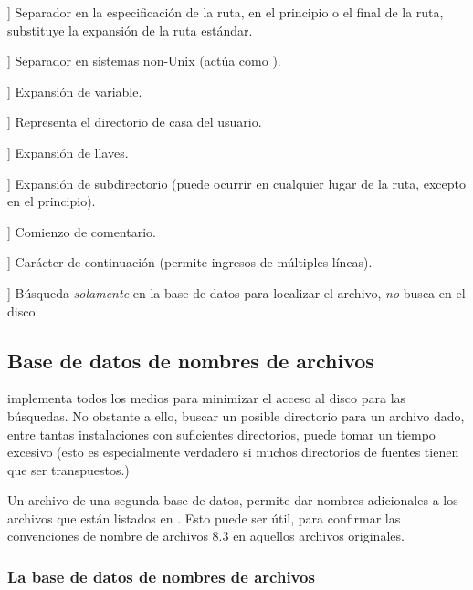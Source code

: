 \documentclass{article}
\begin{document}
\newcommand{\CODE}[1]{\makebox[3em][l]{\code{#1}}}
\begin{ttdescription}
        \item[\CODE{:}] Separador en la especificación de la ruta, en
            el principio o el final de la ruta, substituye la
            expansión de la ruta estándar. \par
	\item[\CODE{;}] Separador en sistemas non-Unix (actúa como
		\code{:}).
	\item[\CODE{\$}] Expansión de variable.
        \item[\CODE{\string~}] Representa el directorio de casa del
            usuario.
	\item[\CODE{\char`\{...\char`\}}] Expansión de llaves.
        \item[\CODE{//}] Expansión de subdirectorio (puede ocurrir en
            cualquier lugar de la ruta, excepto en el principio).
	\item[\CODE{\%}] Comienzo de comentario.
        \item[\CODE{\bs}] Carácter de continuación (permite ingresos
            de múltiples líneas).
        \item[\CODE{!!}] Búsqueda \emph{solamente} en la base de datos
            para localizar el archivo, \emph{no} busca en el disco.
\end{ttdescription}

\subsection{Base de datos de nombres de archivos}
\label{sec:filename-database}

\KPS{} implementa todos los medios para minimizar el acceso al disco para las
búsquedas. No obstante a ello, buscar un posible directorio para un
archivo dado, entre tantas instalaciones con suficientes directorios,
puede tomar un tiempo excesivo (esto es especialmente verdadero si muchos
directorios de fuentes tienen que ser transpuestos.)

Un archivo  de una segunda base de datos, permite dar
nombres adicionales a los archivos que están listados en .
Esto puede ser útil, para confirmar las convenciones de nombre de
archivos  8.3 en aquellos archivos originales.

\subsubsection{La base de datos de nombres de archivos}
\label{sec:ls-R}
\end{document}
